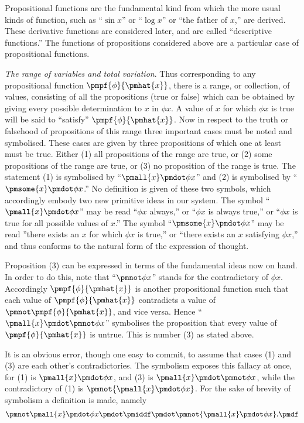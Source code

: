 \documentclass[letterpaper,12pt,openany,leqno]{book}
\newcommand{\pagefirst}[1]{\marginnote[\boxed{\text{#1}}]{\boxed{\text{#1}}}}
\begin{document}
Propositional functions are the fundamental kind from which the more usual kinds of function, such as ``$\sin x$'' or ``$\log x$'' or ``the father of $x$,'' are derived. These derivative functions are considered later, and are called ``descriptive functions.'' The functions of propositions considered above are a particular case of propositional functions.

\textit{The range of variables and total variation}. Thus corresponding to any propositional function $\pmpf{\phi}{\pmhat{x}}$, there is a range, or collection, of values, consisting of all the propositions (true or false) which can be obtained by giving \pagefirst{16} every possible determination to $x$ in $\phi x$. A value of $x$ for which $\phi x$ is true will be said to ``satisfy'' $\pmpf{\phi}{\pmhat{x}}$. Now in respect to the truth or falsehood of propositions of this range three important cases must be noted and symbolised. These cases are given by three propositions of which one at least must be true. Either (1) all propositions of the range are true, or (2) some propositions of the range are true, or (3) no proposition of the range is true. The statement (1) is symbolised by ``$\pmall{x}\pmdot\phi x$'' and (2) is symbolised by ``$\pmsome{x}\pmdot\phi x$.'' No definition is given of these two symbols, which accordingly embody two new primitive ideas in our system. The symbol ``$\pmall{x}\pmdot\phi x$'' may be read ``$\phi x$ always,'' or ``$\phi x$ is always true,'' or ``$\phi x$ is true for all possible values of $x$.'' The symbol ``$\pmsome{x}\pmdot\phi x$'' may be read ''there exists an $x$ for which $\phi x$ is true,'' or ``there exists an $x$ satisfying $\phi x$,'' and thus conforms to the natural form of the expression of thought.

Proposition (3) can be expressed in terms of the fundamental ideas now on hand. In order to do this, note that ``$\pmnot \phi x$'' stands for the contradictory of $\phi x$. Accordingly $\pmpf{\phi}{\pmhat{x}}$ is another propositional function such that each value of $\pmpf{\phi}{\pmhat{x}}$ contradicts a value of $\pmnot\pmpf{\phi}{\pmhat{x}}$, and vice versa. Hence ``$\pmall{x}\pmdot\pmnot \phi x$'' symbolises the proposition that every value of $\pmpf{\phi}{\pmhat{x}}$ is untrue. This is number (3) as stated above.

It is an obvious error, though one easy to commit, to assume that cases (1) and (3) are each other's contradictories. The symbolism exposes this fallacy at once, for (1) is $\pmall{x}\pmdot \phi x$, and (3) is $\pmall{x}\pmdot \pmnot \phi x$, while the contradictory of (1) is $\pmnot\{\pmall{x}\pmdot \phi x\}$. For the sake of brevity of symbolism a definition is made, namely
\[
	\pmnot\pmall{x}\pmdot \phi x \pmdot \pmiddf \pmdot \pmnot\{\pmall{x}\pmdot \phi x\}. \pmdf
\]
\end{document}

